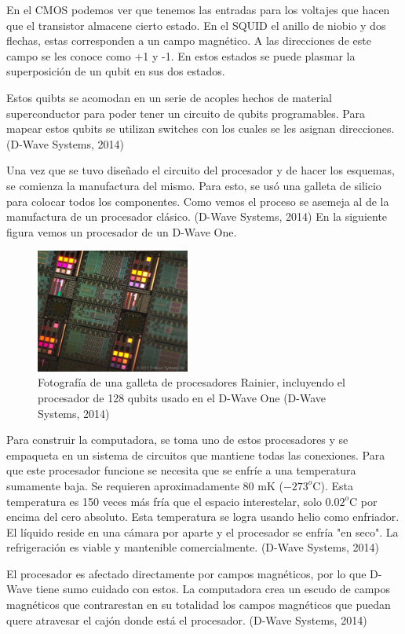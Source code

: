 \documentclass[11pt,a4paper]{article}
\begin{document}
En el CMOS podemos ver que tenemos las entradas para los voltajes que hacen que el transistor almacene cierto estado. En el SQUID el anillo de niobio y dos flechas, estas corresponden a un campo magnético. A las direcciones de este campo se les conoce como +1 y -1. En estos estados se puede plasmar la superposición de un qubit en sus dos estados.

Estos quibts se acomodan en un serie de acoples hechos de material superconductor para poder tener un circuito de qubits programables. Para mapear estos qubits se utilizan switches con los cuales se les asignan direcciones. (D-Wave Systems, 2014)

Una vez que se tuvo diseñado el circuito del procesador y de hacer los esquemas, se comienza la manufactura del mismo. Para esto, se usó una galleta de silicio para colocar todos los componentes. Como vemos el proceso se asemeja al de la manufactura de un procesador clásico. (D-Wave Systems, 2014) En la siguiente figura vemos un procesador de un D-Wave One.
\clearpage
\begin{figure}
\centering
\includegraphics[width=0.45\textwidth]{proce}
\caption{Fotografía de una galleta de procesadores Rainier, incluyendo el procesador de 128 qubits usado en el D-Wave One (D-Wave Systems, 2014)}
\end{figure}

Para construir la computadora, se toma uno de estos procesadores y se empaqueta en un sistema de circuitos que mantiene todas las conexiones. Para que este procesador funcione se necesita que se enfríe a una temperatura sumamente baja. Se requieren aproximadamente 80 mK ($-273^o$C). Esta temperatura es 150 veces más fría que el espacio interestelar, solo $0.02^o$C por encima del cero absoluto. Esta temperatura se logra usando helio como enfriador. El líquido reside en una cámara por aparte y el procesador se enfría "en seco". La refrigeración es viable y mantenible comercialmente. (D-Wave Systems, 2014)

El procesador es afectado directamente por campos magnéticos, por lo que D-Wave tiene sumo cuidado con estos. La computadora crea un escudo de campos magnéticos que contrarestan en su totalidad los campos magnéticos que puedan quere atravesar el cajón donde está el procesador. (D-Wave Systems, 2014)
\end{document}
